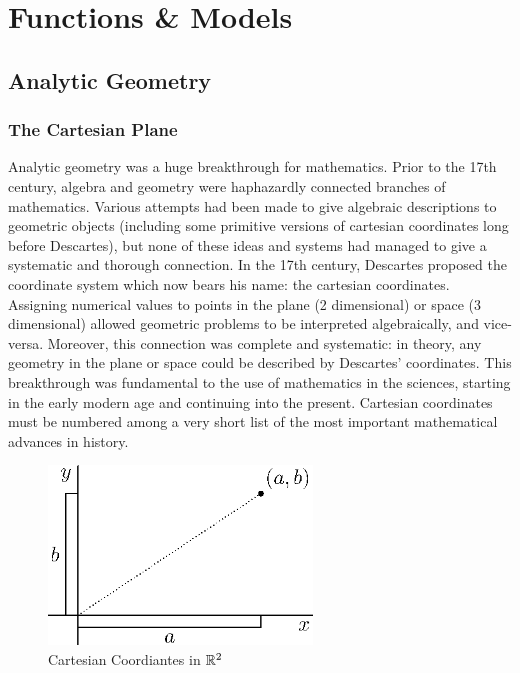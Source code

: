 \documentclass[fleqn]{report}
\begin{document}
\chapter{Functions \& Models}
\label{functions-and-models}

\section{Analytic Geometry}
\label{analytic-geometry}

\subsection{The Cartesian Plane}
\label{cartesian-plane}

Analytic geometry was a huge breakthrough for
mathematics. Prior to the 17th century, algebra and geometry
were haphazardly connected branches of mathematics. Various
attempts had been made to give algebraic descriptions to
geometric objects (including some primitive versions of
cartesian coordinates long before Descartes), but none of
these ideas and systems had managed to give a systematic and
thorough connection. In the 17th century,
Descartes proposed the coordinate system which now bears his name:
the cartesian coordinates. Assigning numerical values to
points in the plane (2 dimensional) or space (3 dimensional)
allowed geometric problems to be interpreted algebraically, and
vice-versa. Moreover, this connection was complete and
systematic: in theory, any geometry in the plane or space
could be described by Descartes' coordinates. This
breakthrough was fundamental to the use of mathematics in
the sciences, starting in the early modern age and continuing
into the present. Cartesian coordinates must be numbered
among a very short list of the most important mathematical
advances in history.

\begin{figure}[b]
\centering
\includegraphics[width=7cm]{figure01.eps}
\caption{Cartesian Coordiantes in $\mathbb{R}^2$}
\label{figure-cartesian-coordiantes}
\end{figure}
\end{document}

